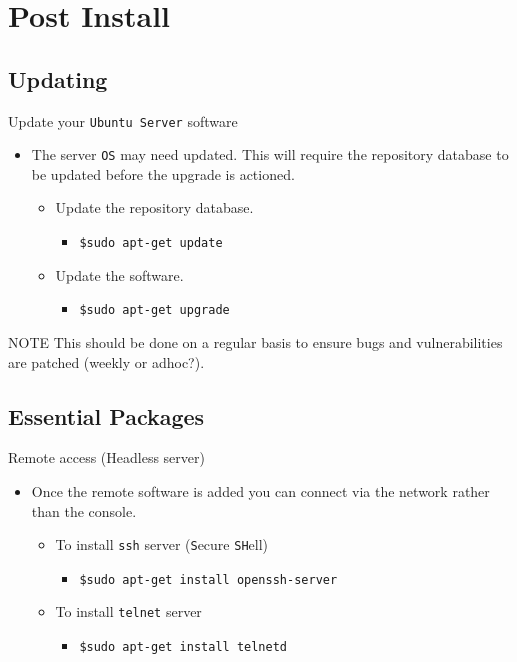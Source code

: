 \documentclass[aspectratio=169]{beamer}
\begin{document}
\section{Post Install}
\subsection{Updating}
\begin{frame}{Update your \texttt{Ubuntu Server} software}
  \begin{itemize}
    \item The server \texttt{OS} may need updated. This will require the repository database to be updated before the upgrade is actioned.
      \begin{itemize}
        \item Update the repository database.
          \begin{itemize}
            \item \texttt{\$sudo apt-get update}
          \end{itemize}
        \item Update the software.
          \begin{itemize}
            \item \texttt{\$sudo apt-get upgrade}
          \end{itemize}
      \end{itemize}
  \end{itemize}
  \begin{block}{NOTE}
    This should be done on a regular basis to ensure bugs and vulnerabilities are patched (weekly or adhoc?). 
  \end{block}
\end{frame}

\subsection{Essential Packages}
\begin{frame}{Remote access (Headless server)}
  \begin{itemize}
    \item Once the remote software is added you can connect via the network rather than the console.
      \begin{itemize}
        \item To install \texttt{ssh} server (\texttt{S}ecure \texttt{SH}ell)
          \begin{itemize}
            \item \texttt{\$sudo apt-get install openssh-server}
          \end{itemize}
        \item To install \texttt{telnet} server
          \begin{itemize}
            \item \texttt{\$sudo apt-get install telnetd}
          \end{itemize}
      \end{itemize}
  \end{itemize}
\end{frame}
\end{document}
